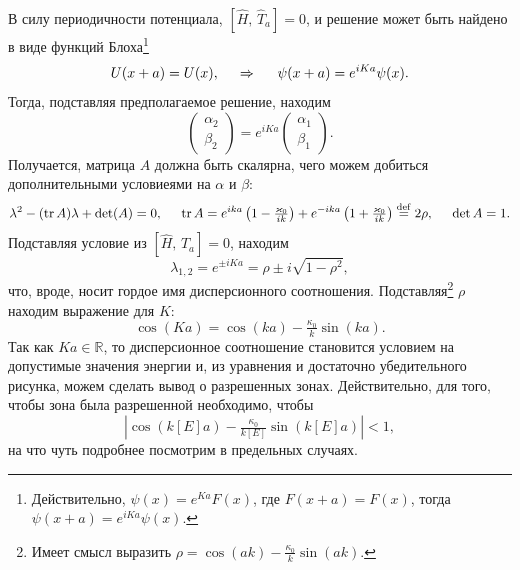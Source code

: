 В силу периодичности потенциала, $[\hat{H},\, \hat{T}_a] = 0$, и решение может быть найдено в виде функций Блоха\footnote{
    Действительно, $\psi(x) = e^{K a} F(x)$, где $F(x+a) = F(x)$, тогда 
    $\psi(x+a) = e^{i K a} \psi(x)$.
} 
\begin{equation*}
    U(x+a) = U(x),
    \hspace{0.5cm} \Rightarrow \hspace{0.5cm}
    \psi(x+a) = e^{i K a} \psi(x).
\end{equation*}
Тогда, подставляя предполагаемое решение, находим
\begin{equation*}
    \begin{pmatrix}
        \alpha_2 \\ \beta_2
    \end{pmatrix} = e^{i K a} \begin{pmatrix}
        \alpha_1 \\ \beta_1
    \end{pmatrix}.
\end{equation*}
Получается, матрица $A$ должна быть скалярна, чего можем добиться дополнительными условиеями на $\alpha$ и $\beta$:
\begin{equation*}
    \lambda^2 - (\mathop{\mathrm{tr}}\nolimits A) \lambda + \det (A) = 0,
    \hspace{5 mm} 
    \mathop{\mathrm{tr}}\nolimits A = e^{i k a} \left(1 - \tfrac{\varkappa_0}{ik}\right) + e^{-ika} \left(
        1 + \tfrac{\varkappa_0}{ik}
    \right) \overset{\mathrm{def}}{=} 2 \rho,
    \hspace{5 mm} 
    \det A = 1.
\end{equation*}
Подставляя условие из $[\hat{H},\, \hat{T}_a] = 0$, находим 
\begin{equation*}
    \lambda_{1, 2} = e^{\pm i K a} = \rho \pm i \sqrt{1 - \rho^2},
\end{equation*}
что, вроде, носит гордое имя дисперсионного соотношения. Подставляя\footnote{
    Имеет смысл выразить $\rho = \cos(ak) - \frac{\kappa_0}{k} \sin(ak)$.
}  $\rho$ находим выражение для $K$:
\begin{equation*}
    \cos (Ka) = \cos (ka) - \tfrac{\kappa_0}{k} \sin (ka).
\end{equation*}
Так как $K a \in \mathbb{R}$, то дисперсионное соотношение становится условием на допустимые значения энергии и, из уравнения и достаточно убедительного рисунка, можем сделать вывод о разрешенных зонах. Действительно, для того, чтобы зона была разрешенной необходимо, чтобы
\begin{equation}
    |\cos (k[E] a) - \tfrac{\kappa_0}{k[E]} \sin (k[E]a)| < 1,
\end{equation}
на что чуть подробнее посмотрим в предельных случаях.


